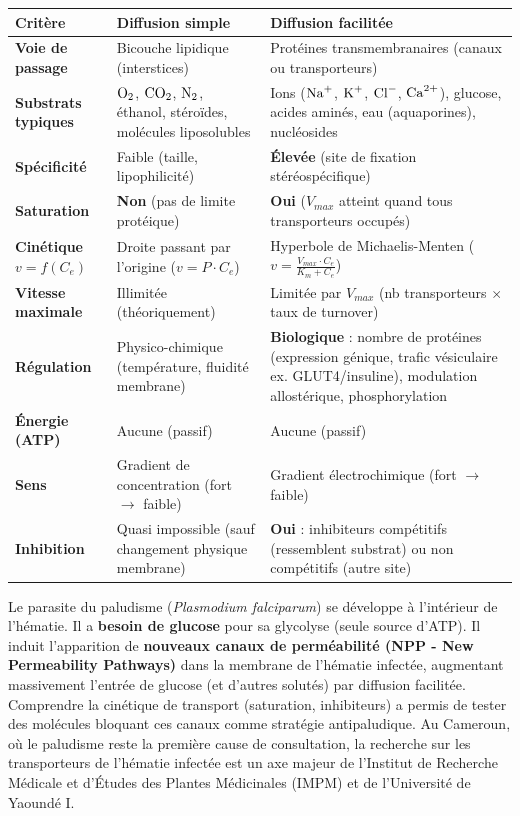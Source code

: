 \documentclass[11pt]{article}
\begin{document}
\begin{center}
\begin{tabularx}{\linewidth}{|l|X|X|}\hline
\rowcolor{popblueL}
\textbf{Critère} & \textbf{Diffusion simple} & \textbf{Diffusion facilitée} \\ \hline
\textbf{Voie de passage} & Bicouche lipidique (interstices) & Protéines transmembranaires (canaux ou transporteurs) \\ \hline
\textbf{Substrats typiques} & $\ce{O2}$, $\ce{CO2}$, $\ce{N2}$, éthanol, stéroïdes, molécules liposolubles & Ions ($\ce{Na+}$, $\ce{K+}$, $\ce{Cl-}$, $\ce{Ca^{2+}}$), glucose, acides aminés, eau (aquaporines), nucléosides \\ \hline
\textbf{Spécificité} & Faible (taille, lipophilicité) & \textbf{Élevée} (site de fixation stéréospécifique) \\ \hline
\textbf{Saturation} & \textbf{Non} (pas de limite protéique) & \textbf{Oui} ($V_{max}$ atteint quand tous transporteurs occupés) \\ \hline
\textbf{Cinétique $v = f(C_e)$} & Droite passant par l'origine ($v = P \cdot C_e$) & Hyperbole de Michaelis-Menten ($v = \frac{V_{max} \cdot C_e}{K_m + C_e}$) \\ \hline
\textbf{Vitesse maximale} & Illimitée (théoriquement) & Limitée par $V_{max}$ (nb transporteurs $\times$ taux de turnover) \\ \hline
\textbf{Régulation} & Physico-chimique (température, fluidité membrane) & \textbf{Biologique} : nombre de protéines (expression génique, trafic vésiculaire ex. GLUT4/insuline), modulation allostérique, phosphorylation \\ \hline
\textbf{Énergie (ATP)} & Aucune (passif) & Aucune (passif) \\ \hline
\textbf{Sens} & Gradient de concentration (fort $\rightarrow$ faible) & Gradient électrochimique (fort $\rightarrow$ faible) \\ \hline
\textbf{Inhibition} & Quasi impossible (sauf changement physique membrane) & \textbf{Oui} : inhibiteurs compétitifs (ressemblent substrat) ou non compétitifs (autre site) \\ \hline
\end{tabularx}
\end{center}

\begin{savaistu}
Le parasite du paludisme (\emph{Plasmodium falciparum}) se développe à l'intérieur de l'hématie. Il a \textbf{besoin de glucose} pour sa glycolyse (seule source d'ATP). Il induit l'apparition de \textbf{nouveaux canaux de perméabilité (NPP - New Permeability Pathways)} dans la membrane de l'hématie infectée, augmentant massivement l'entrée de glucose (et d'autres solutés) par diffusion facilitée. Comprendre la cinétique de transport (saturation, inhibiteurs) a permis de tester des molécules bloquant ces canaux comme stratégie antipaludique. Au Cameroun, où le paludisme reste la première cause de consultation, la recherche sur les transporteurs de l'hématie infectée est un axe majeur de l'Institut de Recherche Médicale et d'Études des Plantes Médicinales (IMPM) et de l'Université de Yaoundé I.
\end{savaistu}
\end{document}
